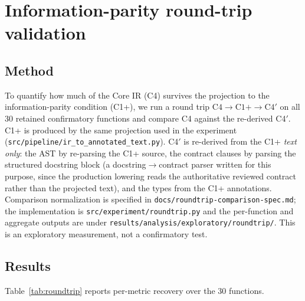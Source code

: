
\section{Information-parity round-trip validation}
\label{app:D}

\subsection*{Method}

To quantify how much of the Core IR (C4) survives the projection to the
information-parity condition (C1+), we run a round trip
$\text{C4} \rightarrow \text{C1+} \rightarrow \text{C4}'$ on all 30 retained
confirmatory functions and compare C4 against the re-derived C4$'$. C1+ is
produced by the same projection used in the experiment
(\texttt{src/pipeline/ir\_to\_annotated\_text.py}). C4$'$ is re-derived from the
C1+ \emph{text only}: the AST by re-parsing the C1+ source, the contract
clauses by parsing the structured docstring block (a docstring$\rightarrow$contract
parser written for this purpose, since the production lowering reads the
authoritative reviewed contract rather than the projected text), and the types
from the C1+ annotations. Comparison normalization is specified in
\texttt{docs/roundtrip-comparison-spec.md}; the implementation is
\texttt{src/experiment/roundtrip.py} and the per-function and aggregate outputs
are under \texttt{results/analysis/exploratory/roundtrip/}. This is an
exploratory measurement, not a confirmatory test.

\subsection*{Results}

Table~\ref{tab:roundtrip} reports per-metric recovery over the 30 functions.

